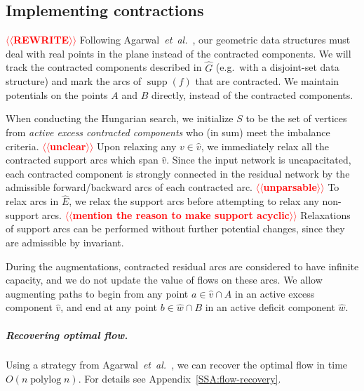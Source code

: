 \documentclass[a4paper,UKenglish]{socg-lipics-v2018}
\makeatletter
\def\note#1{\textcolor{red}{{#1}}}
\def\etal{\emph{et~al.}}
\def\etal{\textit{et~al.}}
\def\polylog{\mathop{\mathrm{polylog}}}
\def\supp{\operatorname{supp}}
\theoremstyle{plain}
\numberwithin{figure}{section}
\renewcommand{\paragraph}{\subparagraph}
\def\EMPH#1{\textcolor{BrickRed}{{\emph{#1}}}}
\def\n@te#1{\textsf{\boldmath \textbf{$\langle\!\langle$#1$\rangle\!\rangle$}}\leavevmode}
\def\note#1{\textcolor{red}{\n@te{#1}}}
\makeatother
\begin{document}
\begin{toappendix}
\subsection{Implementing contractions}
\label{SSA:contraction}

\note{REWRITE}
Following Agarwal~\etal~\cite{AFPVX17}, our geometric data structures must deal
with real points in the plane instead of the contracted components.
We will track the contracted components described in $\hat{G}$ (e.g.\ with a
disjoint-set data structure) and mark the arcs of $\supp(f)$ that are
contracted.
We maintain potentials on the points $A$ and $B$ directly, instead of the
contracted components.

When conducting the Hungarian search, we initialize $S$ to be the set of vertices from
\EMPH{active excess contracted components} who (in sum) meet the imbalance
criteria. \note{unclear}
Upon relaxing any $v \in \hat{v}$, we immediately relax all the contracted
support arcs which span $\hat{v}$.
Since the input network is uncapacitated, each contracted component is
strongly connected in the residual network by the admissible forward/backward
arcs of each contracted arc. \note{unparsable}
To relax arcs in $\hat{E}$, we relax the support arcs before attempting to
relax any non-support arcs.  \note{mention the reason to make support acyclic}
Relaxations of support arcs can be performed without further potential changes,
since they are admissible by invariant.

During the augmentations, contracted residual arcs are considered to have infinite
capacity, and we do not update the value of flows on these arcs.
We allow augmenting paths to begin from any point $a \in \hat{v} \cap A$ in an active
excess component $\hat{v}$, and end at any point $b \in \hat{w} \cap B$ in an active
deficit component $\hat{w}$.

\end{toappendix}

\paragraph{Recovering optimal flow.}
Using a strategy from Agarwal~\etal~\cite{AFPVX17}, we can recover the optimal
flow in time $O(n\polylog n)$.
For details see Appendix~\ref{SSA:flow-recovery}.
\end{document}
